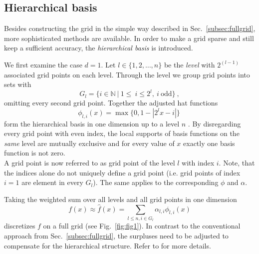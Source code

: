\subsection{Hierarchical basis}
Besides constructing the grid in the simple way described in Sec.~\ref{subsec:fullgrid},
more sophisticated methods are available. In order to make a grid
sparse and still keep a sufficient accuracy, the
\emph{hierarchical basis} is introduced.
\par
We first examine the case $d = 1$.
Let $l \in \{1,2,\dots,n\}$ be the \emph{level} with $2^{(l-1)}$ associated
grid points on each level. Through the level we group grid points
into sets with
$$G_l = \{i \in \mathbb{N} \ | \ 1 \leq \ i \leq 2^l, \ i \ \text{odd}\} \ ,$$
omitting every second grid point. Together the adjusted hat functions
$$\phi_{l,i}(x) = \max\{0, 1 - |2^lx - i|\} \ $$
form the hierarchical basis in one dimension up to a level $n$
\cite{disspfl}.
By disregarding every
grid point with even index, the local supports of basis functions on the \emph{same}
level are mutually exclusive and for every value of $x$ exactly one basis
function is not zero. \\
A grid point is now referred to as grid point of the level $l$ with index $i$.
Note, that the indices alone do not uniquely define a grid point (i.e. grid
points of index $i = 1$ are element in every $G_l$). The same applies to
the corresponding $\phi$ and $\alpha$.
\par
Taking the weighted sum over all levels and all grid points in one dimension
$$ f(x) \approx \hat{f}(x) =  \sum_{l \leq n, i \in G_l}{\alpha_{l,i}\phi_{l,i}(x)}$$
discretizes $f$ on a full grid \cite{disspfl} (see Fig.~\ref{fig:fig1}).
In contrast to the conventional approach from
Sec.~\ref{subsec:fullgrid}, the surpluses need to be adjusted to compensate
for the hierarchical structure. Refer to \cite{artbunlong} for more details.

\par

